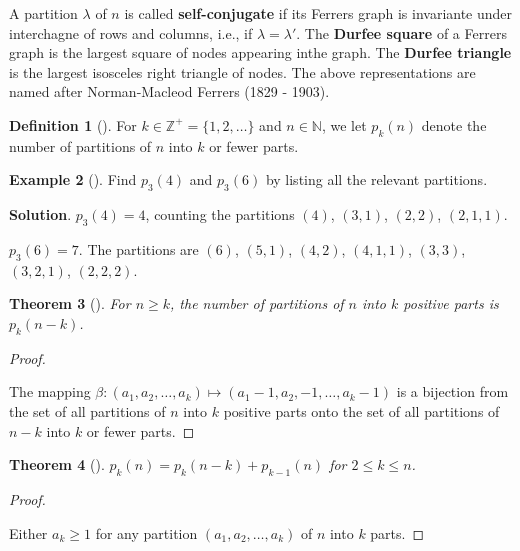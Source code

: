 \documentclass[10pt,]{book}
\newcommand{\terminology}[1]{\textbf{#1}}
\theoremstyle{plain}
\newtheorem{theorem}{Theorem}[section]
\theoremstyle{definition}
\newtheorem{definition}[theorem]{Definition}
\theoremstyle{definition}
\newtheorem{example}[theorem]{Example}
\theoremstyle{definition}
\theoremstyle{definition}
\numberwithin{equation}{chapter}
\def\N{\mathbb N}
\def\Z{\mathbb Z}
\begin{document}
\par
\hypertarget{p-1218}{}%
A partition \(\lambda\) of \(n\) is called \terminology{self-conjugate} if its Ferrers graph is invariante under interchagne of rows and columns, i.e., if \(\lambda = \lambda'\).  The \terminology{Durfee square} of a Ferrers graph is the largest square of nodes appearing inthe graph.  The \terminology{Durfee triangle} is the largest isosceles right triangle of nodes.  The above representations are named after Norman-Macleod Ferrers (1829 - 1903).%
\begin{definition}[{}]\label{def-numpartitions}
\hypertarget{p-1219}{}%
For \(k \in \Z^+ = \{1,2,\ldots\}\) and \(n \in \N\), we let \(p_k(n)\) denote the number of partitions of \(n\) into \(k\) or fewer parts.%
\end{definition}
\begin{example}[]\label{ex_partitions3parts}
\hypertarget{p-1220}{}%
Find \(p_3(4)\) and \(p_3(6)\) by listing all the relevant partitions.%
\par\smallskip%
\noindent\textbf{Solution}.\hypertarget{solution-118}{}\quad%
\hypertarget{p-1221}{}%
\(p_3(4) = 4\), counting the partitions \((4)\), \((3,1)\), \((2,2)\), \((2,1,1)\).%
\par
\hypertarget{p-1222}{}%
\(p_3(6) = 7\).  The partitions are \((6)\), \((5,1)\), \((4,2)\), \((4,1,1)\), \((3,3)\), \((3,2,1)\), \((2,2,2)\).%
\end{example}
\begin{theorem}[{}]\label{thm-positiveparts}
\hypertarget{p-1223}{}%
For \(n \ge k\), the number of partitions of \(n\) into \(k\) positive parts is \(p_k(n-k)\).%
\end{theorem}
\begin{proof}\hypertarget{proof-14}{}
\hypertarget{p-1224}{}%
The mapping \(\beta: (a_1, a_2, \ldots, a_k) \mapsto (a_1 - 1, a_2, -1, \ldots, a_k-1)\) is a bijection from the set of all partitions of \(n\) into \(k\) positive parts onto the set of all partitions of \(n-k\) into \(k\) or fewer parts.%
\end{proof}
\begin{theorem}[{}]\label{thm-partitionrecurrence}
\hypertarget{p-1225}{}%
\(p_k(n) = p_k(n-k) + p_{k-1}(n)\) for \(2 \le k \le n\).%
\end{theorem}
\begin{proof}\hypertarget{proof-15}{}
\hypertarget{p-1226}{}%
Either \(a_k \ge 1\) for any partition \((a_1, a_2, \ldots, a_k)\) of \(n\) into \(k\) parts.%
\end{proof}
\end{document}
